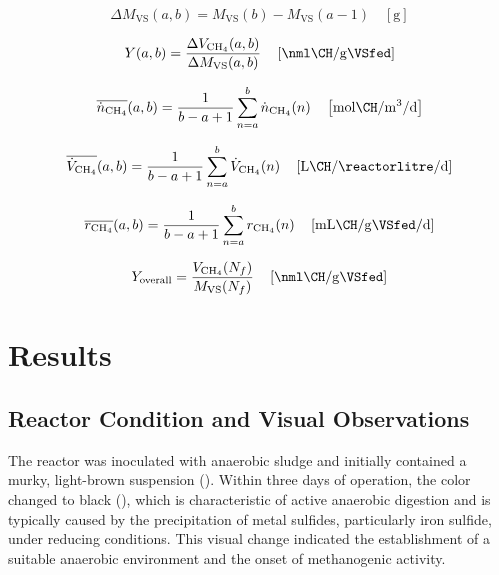 \documentclass[12pt, a4paper, oneside]{report}
\begin{document}
\begin{equation}
    \Delta M_{\mathrm{VS}}(a,b) = M_{\mathrm{VS}}(b) - M_{\mathrm{VS}}(a-1) \quad \left[\unit{\gram}\right]
    \label{eq:deltaMVS}
\end{equation}

\begin{equation}
    Y(a,b) = \frac{\Delta V_{\mathrm{CH_4}}(a,b)}{\Delta M_{\mathrm{VS}}(a,b)} \quad \left[\unit{\nml\CH\per\gram\VSfed}\right]
    \label{eq:phaseYield}
\end{equation}

\begin{equation}
    \overline{\dot{n}_{\mathrm{CH_4}}}(a,b) = \frac{1}{b - a + 1} \sum_{n=a}^{b} \dot{n}_{\mathrm{CH_4}}(n) \quad \left[\unit{\mol\CH\per\cubic\metre\per\day}\right]
    \label{eq:avgMolRate}
\end{equation}

\begin{equation}
    \overline{\dot{V}_{\mathrm{CH_4}}}(a,b) = \frac{1}{b - a + 1} \sum_{n=a}^{b} \dot{V}_{\mathrm{CH_4}}(n) \quad \left[\unit{\litre\CH\per\reactorlitre\per\day}\right]
    \label{eq:avgVolRate}
\end{equation}

\begin{equation}
    \overline{r_{\mathrm{CH_4}}}(a,b) = \frac{1}{b - a + 1} \sum_{n=a}^{b} r_{\mathrm{CH_4}}(n) \quad \left[\unit{\milli\litre\CH\per\gram\VSfed\per\day}\right]
    \label{eq:avgDailyRate}
\end{equation}

\begin{equation}
    Y_{\text{overall}} = \frac{V_{\mathrm{CH_4}}(N_f)}{M_{\mathrm{VS}}(N_f)} \quad \left[\unit{\nml\CH\per\gram\VSfed}\right]
    \label{eq:overallYield}
\end{equation}
\clearpage{}
\clearpage{}\chapter{Results}
\label{ch:results}

\section{Reactor Condition and Visual Observations}
\label{sec:reactor_condition}

The reactor was inoculated with anaerobic sludge and initially contained a murky, light-brown suspension (). Within three days of operation, the color changed to black (), which is characteristic of active anaerobic digestion and is typically caused by the precipitation of metal sulfides, particularly iron sulfide, under reducing conditions. This visual change indicated the establishment of a suitable anaerobic environment and the onset of methanogenic activity.
\end{document}
